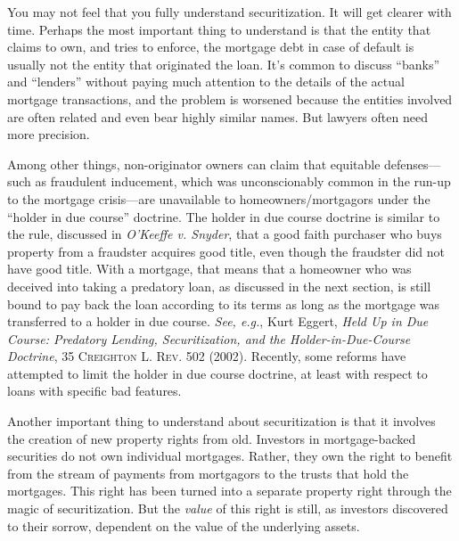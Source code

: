 
\item You may not feel that you fully understand securitization.  It will get
clearer with time.  Perhaps the most important thing to understand is that the
entity that claims to own, and tries to enforce, the mortgage debt in case of
default is usually not the entity that originated the loan.  It's common to
discuss ``banks'' and ``lenders'' without paying much attention to the details
of the actual mortgage transactions, and the problem is worsened because the
entities involved are often related and even bear highly similar names.  But
lawyers often need more precision.


\item Among other things, non-originator owners can claim that equitable
defenses---such as fraudulent inducement, which was unconscionably common in
the run-up to the mortgage crisis---are unavailable to homeowners/mortgagors
under the ``holder in due course'' doctrine.  The holder in due course doctrine
is similar to the rule, discussed in \textit{O'Keeffe v. Snyder}, that a good
faith purchaser who buys property from a fraudster acquires good title, even
though the fraudster did not have good title.  With a mortgage, that means that
a homeowner who was deceived into taking a predatory loan, as discussed in the
next section, is still bound to pay back the loan according to its terms as
long as the mortgage was transferred to a holder in due course.  \textit{See,
e.g.}, Kurt Eggert, \textit{Held Up in Due Course: Predatory Lending,
Securitization, and the Holder-in-Due-Course Doctrine}, 35 \textsc{Creighton L.
Rev}. 502 (2002).  Recently, some reforms have attempted to limit the holder in
due course doctrine, at least with respect to loans with specific bad features.


\item Another important thing to understand about securitization is that it
involves the creation of new property rights from old.  Investors in
mortgage-backed securities do not own individual mortgages. Rather, they own
the right to benefit from the stream of payments from mortgagors to the trusts
that hold the mortgages.  This right has been turned into a separate property
right through the magic of securitization.  But the \textit{value} of this
right is still, as investors discovered to their sorrow, dependent on the value
of the underlying assets.

